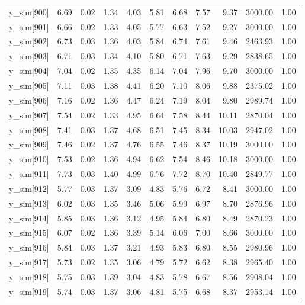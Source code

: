 \begin{table}[ht]
\begin{tabular}{rrrrrrrrrrr}
  y\_sim[900] & 6.69 & 0.02 & 1.34 & 4.03 & 5.81 & 6.68 & 7.57 & 9.37 & 3000.00 & 1.00 \\ 
  y\_sim[901] & 6.66 & 0.02 & 1.33 & 4.05 & 5.77 & 6.63 & 7.52 & 9.27 & 3000.00 & 1.00 \\ 
  y\_sim[902] & 6.73 & 0.03 & 1.36 & 4.03 & 5.84 & 6.74 & 7.61 & 9.46 & 2463.93 & 1.00 \\ 
  y\_sim[903] & 6.71 & 0.03 & 1.34 & 4.10 & 5.80 & 6.71 & 7.63 & 9.29 & 2838.65 & 1.00 \\ 
  y\_sim[904] & 7.04 & 0.02 & 1.35 & 4.35 & 6.14 & 7.04 & 7.96 & 9.70 & 3000.00 & 1.00 \\ 
  y\_sim[905] & 7.11 & 0.03 & 1.38 & 4.41 & 6.20 & 7.10 & 8.06 & 9.88 & 2375.02 & 1.00 \\ 
  y\_sim[906] & 7.16 & 0.02 & 1.36 & 4.47 & 6.24 & 7.19 & 8.04 & 9.80 & 2989.74 & 1.00 \\ 
  y\_sim[907] & 7.54 & 0.02 & 1.33 & 4.95 & 6.64 & 7.58 & 8.44 & 10.11 & 2870.04 & 1.00 \\ 
  y\_sim[908] & 7.41 & 0.03 & 1.37 & 4.68 & 6.51 & 7.45 & 8.34 & 10.03 & 2947.02 & 1.00 \\ 
  y\_sim[909] & 7.46 & 0.02 & 1.37 & 4.76 & 6.55 & 7.46 & 8.37 & 10.19 & 3000.00 & 1.00 \\ 
  y\_sim[910] & 7.53 & 0.02 & 1.36 & 4.94 & 6.62 & 7.54 & 8.46 & 10.18 & 3000.00 & 1.00 \\ 
  y\_sim[911] & 7.73 & 0.03 & 1.40 & 4.99 & 6.76 & 7.72 & 8.70 & 10.40 & 2849.77 & 1.00 \\ 
  y\_sim[912] & 5.77 & 0.03 & 1.37 & 3.09 & 4.83 & 5.76 & 6.72 & 8.41 & 3000.00 & 1.00 \\ 
  y\_sim[913] & 6.02 & 0.03 & 1.35 & 3.46 & 5.06 & 5.99 & 6.97 & 8.70 & 2876.96 & 1.00 \\ 
  y\_sim[914] & 5.85 & 0.03 & 1.36 & 3.12 & 4.95 & 5.84 & 6.80 & 8.49 & 2870.23 & 1.00 \\ 
  y\_sim[915] & 6.07 & 0.02 & 1.36 & 3.39 & 5.14 & 6.06 & 7.00 & 8.66 & 3000.00 & 1.00 \\ 
  y\_sim[916] & 5.84 & 0.03 & 1.37 & 3.21 & 4.93 & 5.83 & 6.80 & 8.55 & 2980.96 & 1.00 \\ 
  y\_sim[917] & 5.73 & 0.02 & 1.35 & 3.06 & 4.79 & 5.72 & 6.62 & 8.38 & 2965.40 & 1.00 \\ 
  y\_sim[918] & 5.75 & 0.03 & 1.39 & 3.04 & 4.83 & 5.78 & 6.67 & 8.56 & 2908.04 & 1.00 \\ 
  y\_sim[919] & 5.74 & 0.03 & 1.37 & 3.06 & 4.81 & 5.75 & 6.68 & 8.37 & 2953.14 & 1.00 \\ 

\end{tabular}
\end{table}
